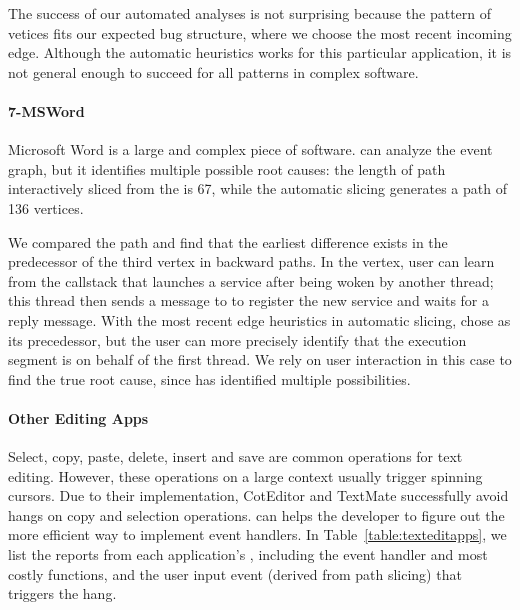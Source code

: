 The success of our automated analyses 
is not surprising because the pattern of vetices fits our expected bug structure,
where we choose the most recent incoming edge.
Although the automatic heuristics works for this particular application, it is
not general enough to succeed for all patterns in complex software.

\paragraph{7-MSWord}

Microsoft Word is a large and complex piece of software. \xxx can analyze the
event graph, but it identifies multiple possible root causes: the length of path
interactively sliced from the \spinningnode is 67, while the automatic slicing
generates a path of 136 vertices.


We compared the path and find that the earliest difference exists in the
predecessor of the third vertex in backward paths. In the vertex, user
can learn from the callstack that  launches a service
 after being woken by another
 thread; this thread then sends a message to 
to register the new service and waits for a reply message. With the most
recent edge heuristics in automatic slicing, \xxx chose  as its
precedessor, but the user can more precisely identify that the execution segment
is on behalf of the first thread. We rely on user interaction in this case
to find the true root cause, since \xxx has identified multiple
possibilities.

\paragraph{Other Editing Apps}

Select, copy, paste, delete, insert and save are common operations for text
editing. However, these operations on a large context usually trigger spinning
cursors. Due to their implementation, CotEditor and TextMate successfully
avoid hangs on copy and selection operations. \xxx can helps the developer
to figure out the more efficient way to implement event handlers. In
Table~\ref{table:texteditapps}, we list the reports from each application's
\spinningnode, including the event handler and most costly functions, and the
user input event (derived from path slicing) that triggers the hang.

